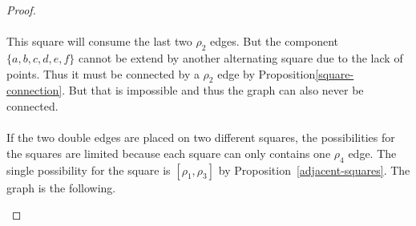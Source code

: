 \begin{proof}
\begin{figure}[H]
\begin{center}
\begin{tikzpicture}[scale=.8]
    \end{tikzpicture}
    \caption{}
  \end{center}
\end{figure}

\paragraph{}This square will consume the last two $\rho_2$ edges. But the component $\{a,b,c,d,e,f\}$ cannot be extend by another alternating square due to the lack of points. Thus it must be connected by a $\rho_2$ edge by Proposition\ref{square-connection}. But that is impossible and thus the graph can also never be connected.

\paragraph{}
If the two double edges are placed on two different squares, the possibilities for the squares are limited because each square can only contains one $\rho_4$ edge. The single possibility for the square is $[\rho_1, \rho_3]$ by Proposition~\ref{adjacent-squares}. The graph is the following.

\begin{figure}[H]
  \begin{center}
\end{center}
\end{figure}
\end{proof}
